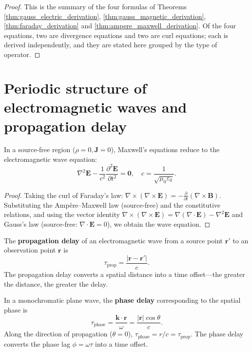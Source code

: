 \begin{proof}
This is the summary of the four formulas of Theorems \ref{thm:gauss_electric_derivation}, \ref{thm:gauss_magnetic_derivation}, \ref{thm:faraday_derivation} and \ref{thm:ampere_maxwell_derivation}. Of the four equations, two are divergence equations and two are curl equations; each is derived independently, and they are stated here grouped by the type of operator.
\end{proof}

\section{Periodic structure of electromagnetic waves and propagation delay}

\begin{theorem}\label{thm:electromagnetic_wave_equation}
In a source-free region ($\rho = 0, \mathbf{J} = 0$), Maxwell's equations reduce to the electromagnetic wave equation:
\[
\boxed{\nabla^2 \mathbf{E} - \frac{1}{c^2} \frac{\partial^2 \mathbf{E}}{\partial t^2} = \mathbf{0}}, \quad c = \frac{1}{\sqrt{\mu_0 \varepsilon_0}}.
\]
\end{theorem}

\begin{proof}
Taking the curl of Faraday's law: $\nabla\times(\nabla\times\mathbf{E}) = -\frac{\partial}{\partial t}(\nabla\times\mathbf{B})$. Substituting the Amp\`ere--Maxwell law (source-free) and the constitutive relations, and using the vector identity $\nabla\times(\nabla\times\mathbf{E}) = \nabla(\nabla\cdot\mathbf{E}) - \nabla^2\mathbf{E}$ and Gauss's law (source-free: $\nabla\cdot\mathbf{E}=0$), we obtain the wave equation.
\end{proof}

\begin{definition}\label{def:propagation_delay}
The \textbf{propagation delay} of an electromagnetic wave from a source point $\mathbf{r}'$ to an observation point $\mathbf{r}$ is
\[
\tau_{\text{prop}} = \frac{|\mathbf{r} - \mathbf{r}'|}{c}.
\]
The propagation delay converts a spatial distance into a time offset---the greater the distance, the greater the delay.
\end{definition}

\begin{definition}\label{def:phase_delay}
In a monochromatic plane wave, the \textbf{phase delay} corresponding to the spatial phase is
\[
\tau_{\text{phase}} = \frac{\mathbf{k}\cdot\mathbf{r}}{\omega} = \frac{|\mathbf{r}|\cos\theta}{c}.
\]
Along the direction of propagation ($\theta=0$), $\tau_{\text{phase}} = r/c = \tau_{\text{prop}}$. The phase delay converts the phase lag $\phi = \omega\tau$ into a time offset.
\end{definition}

